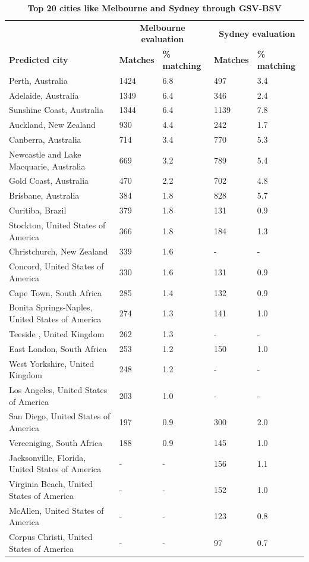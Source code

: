 \documentclass[10pt,letterpaper]{article}
\begin{document}
\begin{table}[!htbp]
\begin{adjustwidth}{-2.25in}{0in}
\caption{\bf Top 20 cities like Melbourne and Sydney through GSV-BSV \label{tab:melbournesydneyGSV}}     
\begin{tabular}{ l  l l l  l}
 \hline    &  \multicolumn{2}{c}{\textbf{Melbourne evaluation}} & \multicolumn{2}{c}{\textbf{Sydney evaluation}}  \\  
\textbf{Predicted city} & \textbf{Matches} & \textbf{\% matching}  & \textbf{Matches} & \textbf{\% matching}\\ \hline
Perth, Australia & 1424 & 6.8 & 497 & 3.4 \\ 
Adelaide, Australia & 1349 & 6.4 & 346 & 2.4 \\ 
Sunshine Coast, Australia & 1344 & 6.4 & 1139 & 7.8 \\ 
Auckland, New Zealand & 930 & 4.4 & 242 & 1.7 \\ 
Canberra, Australia & 714 & 3.4 & 770 & 5.3 \\ 
Newcastle and Lake Macquarie, Australia & 669 & 3.2 & 789 & 5.4 \\ 
Gold Coast, Australia & 470 & 2.2 & 702 & 4.8 \\ 
Brisbane, Australia & 384 & 1.8 & 828 & 5.7 \\ 
Curitiba, Brazil & 379 & 1.8 & 131 & 0.9 \\ 
Stockton, United States of America & 366 & 1.8 & 184 & 1.3 \\ 
Christchurch, New Zealand & 339 & 1.6 &-&- \\ 
Concord, United States of America & 330 & 1.6 & 131 & 0.9 \\ 
Cape Town, South Africa & 285 & 1.4 & 132 & 0.9 \\ 
Bonita Springs-Naples, United States of America & 274 & 1.3 & 141 & 1.0 \\ 
Teeside , United Kingdom & 262 & 1.3 &-&- \\ 
East London, South Africa & 253 & 1.2 & 150 & 1.0 \\ 
West Yorkshire, United Kingdom & 248 & 1.2 &-&- \\ 
Los Angeles, United States of America & 203 & 1.0 &-&- \\ 
San Diego, United States of America & 197 & 0.9 & 300 & 2.0 \\ 
Vereeniging, South Africa & 188 & 0.9 & 145 & 1.0 \\ 
Jacksonville, Florida, United States of America  &-&- & 156 & 1.1\\ 
Virginia Beach, United States of America  &-&- & 152 & 1.0\\ 
McAllen, United States of America&-&- & 123 & 0.8\\ 
Corpus Christi, United States of America&-&- & 97 & 0.7\\ \hline
\end{tabular}
\end{adjustwidth}
\end{table}
\end{document}
